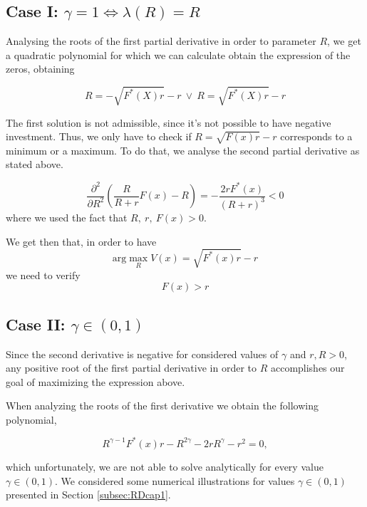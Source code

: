 \subsection{Case I: $\gamma=1 \Leftrightarrow \lambda(R)=R$}

Analysing the roots of the first partial derivative in order to parameter $R$, we get a quadratic polynomial for which we can calculate obtain the expression of the zeros, obtaining

$$  R=-\sqrt{F^*(X)r}-r \  \vee \ R=\sqrt{F^*(X)r}-r$$



The first solution is not admissible, since it's not possible to have negative investment. Thus, we only have to check if $R=\sqrt{F(x)r}-r$ corresponds to a minimum or a maximum. To do that, we analyse the second partial derivative as stated above.

$$\frac{\partial^2}{\partial R^2} \left( \frac{R}{R+r} F(x) -R \right) 
= -\frac{2rF^*(x)}{(R+r)^3}<0$$
where we used the fact that $R,\ r, \ F(x)>0$.

We get then that, in order to have
$$ \text{arg} \max_R V(x)= \sqrt{F^*(x)r}-r $$
we need to verify
\begin{equation}
F(x)>r
\label{ass3}
\end{equation}

\subsection{Case II: $\gamma \in (0,1) $}
Since the second derivative is negative for considered values of $\gamma$ and $r,R>0$, any positive root of the first partial derivative in order to $R$ accomplishes our goal of maximizing the expression above.

When analyzing the roots of the first derivative we obtain the following polynomial, 

$$
R^{\gamma-1}F^*(x)r-R^{2\gamma}-2rR^\gamma-r^2=0,$$

which unfortunately, we are not able to solve analytically for every value $\gamma \in (0,1) $. We considered some numerical illustrations for values $\gamma \in (0,1)$ presented in Section \ref{subsec:RDcap1}.




